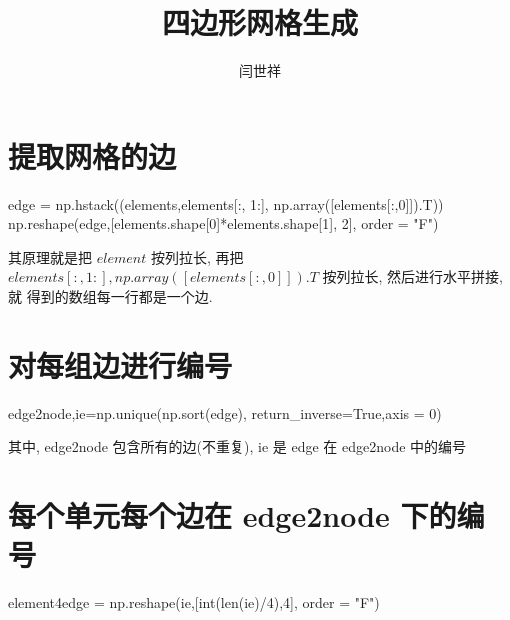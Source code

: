 \documentclass{article}
\begin{document}
\title{四边形网格生成}
\author{闫世祥}
\date{\chntoday}
\maketitle
\section{提取网格的边}

\begin{listing}[H]
    \begin{pythoncode}
        edge = np.hstack((elements,elements[:, 1:], np.array([elements[:,0]]).T))
        np.reshape(edge,[elements.shape[0]*elements.shape[1], 2], order = "F")
    \end{pythoncode}
\end{listing}

其原理就是把 $element$ 按列拉长, 再把
$elements[:, 1:], np.array([elements[:,0]]).T$ 按列拉长, 然后进行水平拼接, 就
得到的数组每一行都是一个边.

\section{对每组边进行编号}
\begin{listing}[H]
    \begin{pythoncode}
        edge2node,ie=np.unique(np.sort(edge), return_inverse=True,axis = 0)
    \end{pythoncode}
\end{listing}
其中, edge2node 包含所有的边(不重复), ie 是 edge 在 edge2node 中的编号
\section{每个单元每个边在 edge2node 下的编号}
\begin{listing}[H]
    \begin{pythoncode}
        element4edge = np.reshape(ie,[int(len(ie)/4),4], order = "F")
    \end{pythoncode}
\end{listing}
\end{document}
